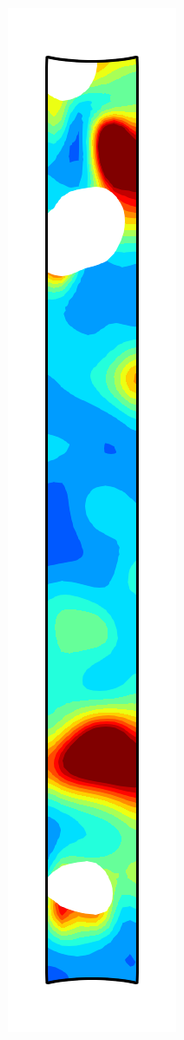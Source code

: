 \begin{figure}[!htb]
\begin{subfigure}{0.08\textwidth}
  \end{subfigure}
  \begin{subfigure}{0.08\textwidth}
    \centering
    \includegraphics[width=\textwidth]{Chapter5/figures/spallation/ep_5}

\end{subfigure}
\end{figure}
